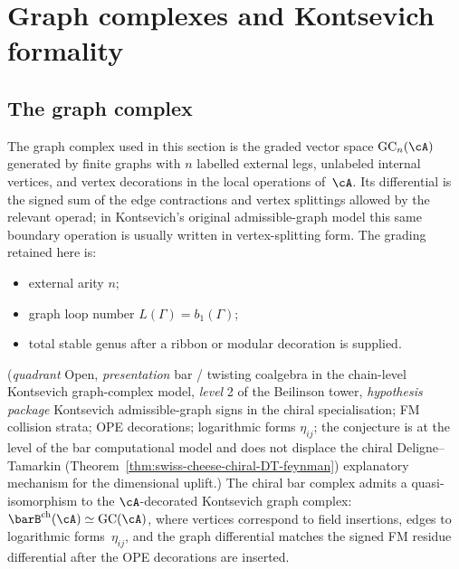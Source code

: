\section{Graph complexes and Kontsevich formality}

\subsection{The graph complex}

\begin{definition}
The graph complex used in this section is the graded vector space
$\mathrm{GC}_n(\cA)$ generated by finite graphs with $n$ labelled
external legs, unlabeled internal vertices, and vertex decorations in
the local operations of~$\cA$.  Its differential is the signed sum of
the edge contractions and vertex splittings allowed by the relevant
operad; in Kontsevich's original admissible-graph model this same
boundary operation is usually written in vertex-splitting form.
The grading retained here is:
\begin{itemize}
\item external arity $n$;
\item graph loop number $L(\Gamma)=b_1(\Gamma)$;
\item total stable genus after a ribbon or modular decoration is
 supplied.
\end{itemize}
\end{definition}

\begin{conjecture}
\label{conj:v1-bar-graph-complex}
\textup{(}\emph{quadrant} Open, \emph{presentation} bar / twisting
coalgebra in the chain-level Kontsevich graph-complex model,
\emph{level} 2 of the Beilinson tower, \emph{hypothesis package}
Kontsevich admissible-graph signs in the chiral specialisation; FM
collision strata; OPE decorations; logarithmic forms $\eta_{ij}$;
the conjecture is at the level of the bar computational model and
does not displace the chiral Deligne--Tamarkin
\textup{(}Theorem~\ref{thm:swiss-cheese-chiral-DT-feynman}\textup{)}
explanatory mechanism for the dimensional uplift.\textup{)}
The chiral bar complex admits a quasi-isomorphism to the
$\cA$-decorated Kontsevich graph complex:
$\barB^{\mathrm{ch}}(\cA) \simeq \mathrm{GC}(\cA)$,
where vertices correspond to field insertions, edges to logarithmic
forms~$\eta_{ij}$, and the graph differential matches the signed FM
residue differential after the OPE decorations are inserted.
\end{conjecture}

